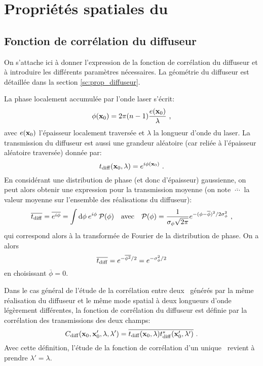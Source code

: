 
\chapter{Propriétés spatiales du \speckle}
\label{ch:anex_speckle}


\section{Fonction de corrélation du diffuseur}
On s'attache ici à donner l'expression de la fonction de corrélation du diffuseur et à introduire les différents paramètres nécessaires. La géométrie du diffuseur est détaillée dans la section \ref{sc:prop_diffuseur}.

La phase localement accumulée par l'onde laser s'écrit:
\begin{equation}
\phi(\mathbf{x}_0)=2\pi (n-1) \frac{e(\mathbf{x}_0)}{\lambda} \text{ ,}
\end{equation}
avec $e(\mathbf{x}_0)$ l'épaisseur localement traversée et $\lambda$ la longueur d'onde du laser. La transmission du diffuseur est aussi une grandeur aléatoire (car reliée à l'épaisseur aléatoire traversée) donnée par:
\begin{equation}
t_{\mathrm{diff}}(\mathbf{x}_0,\lambda)=e^{i \phi(\mathbf{x}_0)} \text{ .}
\end{equation}
En considérant une distribution de phase (et donc d'épaisseur) gaussienne, on peut alors obtenir une expression pour la transmission moyenne (on note $\overline{\:\cdots\:}$ la valeur moyenne sur l'ensemble des réalisations du diffuseur):
\begin{equation}
\overline{t_{\mathrm{diff}}}= \overline{e^{i \phi}} = \int{ \mathrm{d}\phi \: e^{i \phi} \: \mathcal{P}(\phi)} \quad \text{avec} \quad \mathcal{P}(\phi) = \frac{1}{\sigma_{\phi} \sqrt{2 \pi}} e^{-(\phi - \overline{\phi})^2 /2 \sigma_{\phi}^2} \text{ ,}
\end{equation}
qui correspond alors à la transformée de Fourier de la distribution de phase. On a alors
\begin{equation}
\overline{t_{\mathrm{diff}}} = e^{-\overline{\phi^2}/2} = e^{-\sigma_{\phi}^2/2}
\end{equation}
en choisissant $\overline{\phi}=0$. 

Dans le cas général de l'étude de la corrélation entre deux \speckles\ générés par la même réalisation du diffuseur et le même mode spatial à deux longueurs d'onde légèrement différentes, la fonction de corrélation du diffuseur est définie par la corrélation des transmissions des deux champs:
\begin{equation}
C_{\mathrm{diff}}(\mathbf{x}_0,\mathbf{x}_0',\lambda,\lambda')=\overline{t_{\mathrm{diff}}(\mathbf{x}_0,\lambda)t_{\mathrm{diff}}^*(\mathbf{x}_0',\lambda')} \text{ .}
\end{equation}
Avec cette définition, l'étude de la fonction de corrélation d'un unique \speckle\ revient à prendre $\lambda'=\lambda$. 

